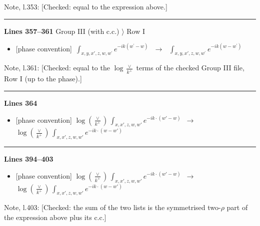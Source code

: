 \documentclass[10pt]{article}
\newenvironment{notebox}{\def\FrameCommand{{\color{notebar}\vrule width 1.5pt}\hspace{6pt}}\MakeFramed{\advance\hsize-\width\FrameRestore}\small}{\endMakeFramed}
\begin{document}
\begin{notebox}\textsf{\small Note, l.353:} [Checked: equal to the expression above.]\end{notebox}
\noindent\rule{\linewidth}{0.3pt}\par\noindent\textbf{Lines 357--361} \quad \textsf{Group III (with c.c.) $\rangle$ Row I} \par
\begin{itemize}[leftmargin=2.2em,itemsep=1pt,topsep=2pt]
\item[\textbf{l.357}] \textsf{\small [phase convention]} $\displaystyle \, \int_{x,y,x',z,w,w^{\prime}} e^{-ik(w^{\prime}-w)}\,$\ $\longrightarrow$\ $\displaystyle \, \int_{x,y,x',z,w,w^{\prime}} e^{-ik(w-w^{\prime})}\,$
\end{itemize}
\begin{notebox}\textsf{\small Note, l.361:} [Checked: equal to the $\log\frac{\vee}{k^{+}}$ terms of the checked Group III file, Row I (up to the phase).]\end{notebox}
\noindent\rule{\linewidth}{0.3pt}\par\noindent\textbf{Lines 364} \par
\begin{itemize}[leftmargin=2.2em,itemsep=1pt,topsep=2pt]
\item[\textbf{l.364}] \textsf{\small [phase convention]} $\displaystyle \log{(\frac{\vee}{k^{+}})}\, \int_{x,x',z,w,w'}e^{-ik\cdot(w'-w)}$\ $\longrightarrow$\ $\displaystyle \log{(\frac{\vee}{k^{+}})}\, \int_{x,x',z,w,w'}e^{-ik\cdot(w-w')}$
\end{itemize}
\noindent\rule{\linewidth}{0.3pt}\par\noindent\textbf{Lines 394--403} \par
\begin{itemize}[leftmargin=2.2em,itemsep=1pt,topsep=2pt]
\item[\textbf{l.394}] \textsf{\small [phase convention]} $\displaystyle \log{(\frac{\vee}{k^{+}})}\, \int_{x,x',z,w,w'}e^{-ik\cdot(w'-w)}$\ $\longrightarrow$\ $\displaystyle \log{(\frac{\vee}{k^{+}})}\, \int_{x,x',z,w,w'}e^{-ik\cdot(w-w')}$
\end{itemize}
\begin{notebox}\textsf{\small Note, l.403:} [Checked: the sum of the two lists is the symmetrised two-$\rho$ part of the expression above plus its c.c.]\end{notebox}
\end{document}
